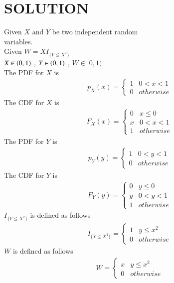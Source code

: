 \documentclass[journal,12pt,twocolumn]{IEEEtran}
\begin{document}
\section*{SOLUTION}
Given $X$ and $Y$ be two independent random\\
variables. \\
Given $W=XI_{\{Y\leq X^2\}}$ \\
$X \in \left(0,1\right)$ , $Y \in \left(0,1\right)$ , $W \in [0,1)$\\
The PDF for $X$ is
\begin{align}
p_X(x) = 
\begin{cases}
     1 & 0 < x  < 1 \\
     0 & otherwise 
\end{cases}\label{1}
\end{align}
The CDF for $X$ is
\begin{align}
F_{X}(x)  = 
\begin{cases}
      0 & x \leq 0 \\
      x & 0 < x < 1 \\
      1 & otherwise
\end{cases}  \label{eq:2}
\end{align}
The PDF for $Y$ is
\begin{align}
p_{Y}(y)  = 
\begin{cases}
      1 & 0 < y < 1 \\
      0 & otherwise 
\end{cases} \label{3}
\end{align}
The CDF for $Y$ is
\begin{align}
F_{Y}(y)  = 
\begin{cases}
      0 & y \leq 0 \\
      y & 0 < y < 1 \\
      1 & otherwise 
\end{cases}\label{4}
\end{align}
$I_{\{Y\leq X^2\}}$ is defined as follows
\begin{align} 
I_{\{Y\leq X^2\}} =
\begin{cases}
    1 & y \leq x^2  \\
    0 & otherwise 
\end{cases} \label{5}
\end{align}
$W$ is defined as follows
\begin{align}
W  = 
\begin{cases}
    x & y \leq x^2 \\
    0 & otherwise
\end{cases}  \label{6}
\end{align}
\end{document}
